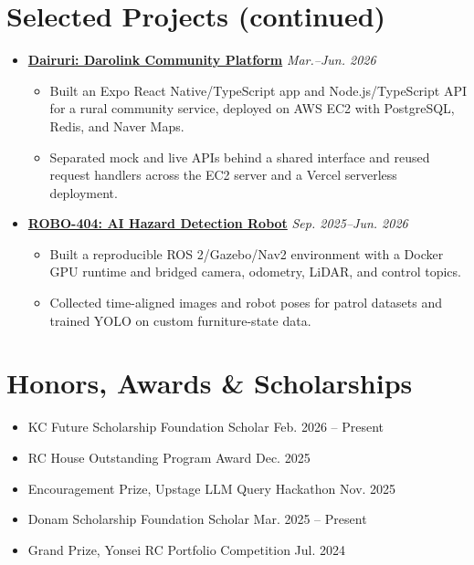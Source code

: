 \documentclass[letterpaper,11pt]{article}
\newcommand{\resumeItemListStart}{\begin{itemize}[leftmargin=0.18in,itemsep=1pt,topsep=2pt]}
\newcommand{\resumeItemListEnd}{\end{itemize}\vspace{-4pt}}
\newcommand{\resumeSubHeadingListStart}{\begin{itemize}[leftmargin=0in,label={},itemsep=3pt,topsep=2pt]}
\newcommand{\resumeSubHeadingListEnd}{\end{itemize}}
\begin{document}
\newpage
\section{Selected Projects (continued)}
\resumeSubHeadingListStart
  \item \textbf{\href{https://github.com/rammmaa/dairuri}{Dairuri: Darolink Community Platform}} \hfill \textit{Mar.--Jun. 2026}
    \resumeItemListStart
      \item\small{Built an Expo React Native/TypeScript app and Node.js/TypeScript API for a rural community service, deployed on AWS EC2 with PostgreSQL, Redis, and Naver Maps.}
      \item\small{Separated mock and live APIs behind a shared interface and reused request handlers across the EC2 server and a Vercel serverless deployment.}
    \resumeItemListEnd
  \item \textbf{\href{https://github.com/YBIGTA/27th-conference-robo404}{ROBO-404: AI Hazard Detection Robot}} \hfill \textit{Sep. 2025--Jun. 2026}
    \resumeItemListStart
      \item\small{Built a reproducible ROS 2/Gazebo/Nav2 environment with a Docker GPU runtime and bridged camera, odometry, LiDAR, and control topics.}
      \item\small{Collected time-aligned images and robot poses for patrol datasets and trained YOLO on custom furniture-state data.}
    \resumeItemListEnd
\resumeSubHeadingListEnd

\section{Honors, Awards \& Scholarships}
\begin{itemize}[leftmargin=0.18in,itemsep=1pt,topsep=2pt]
  \item\small{KC Future Scholarship Foundation Scholar \hfill Feb. 2026 -- Present}
  \item\small{RC House Outstanding Program Award \hfill Dec. 2025}
  \item\small{Encouragement Prize, Upstage LLM Query Hackathon \hfill Nov. 2025}
  \item\small{Donam Scholarship Foundation Scholar \hfill Mar. 2025 -- Present}
  \item\small{Grand Prize, Yonsei RC Portfolio Competition \hfill Jul. 2024}
\end{itemize}
\end{document}
